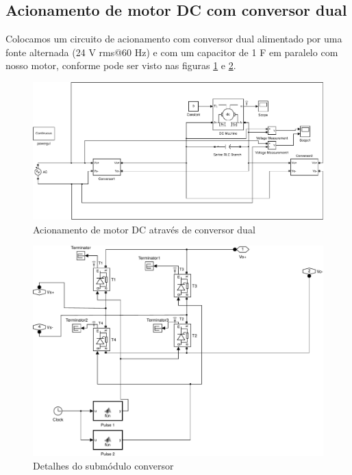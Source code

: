 \documentclass{article}
\begin{document}
\subsection{Acionamento de motor DC com conversor dual}
Colocamos um circuito de acionamento com conversor dual alimentado por uma fonte alternada (24 V rms@60 Hz) e com um capacitor de 1 F em paralelo com nosso motor, conforme pode ser visto nas figuras \ref{fig:sim5} e \ref{fig:sim6}.
\begin{figure}[H]
	\centering
	\includegraphics[width=\linewidth]{matlab/sim5}
	\caption{Acionamento de motor DC através de conversor dual}
	\label{fig:sim5}
\end{figure}
\begin{figure}[H]
	\centering
	\includegraphics[width=\linewidth]{matlab/sim6}
	\caption{Detalhes do submódulo conversor}
	\label{fig:sim6}
\end{figure}
\end{document}
